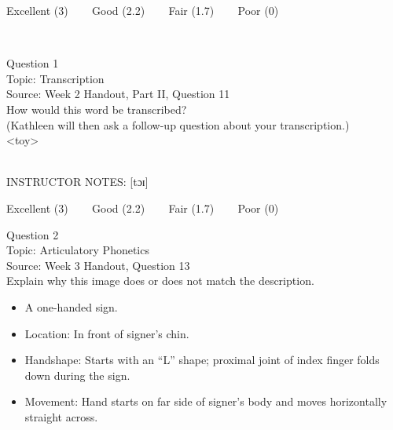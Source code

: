 \documentclass[12pt]{article}
\begin{document}
\vfill
Excellent (3) ~~~ Good (2.2) ~~~ Fair (1.7) ~~~ Poor (0)
\newpage

\begin{center}
\textbf{{\color{red}{\HUGE END OF EXAM}}}\\

\end{center}
\newpage

\begin{center}
\textbf{{\color{blue}{\HUGE START OF EXAM\\}}}

\textbf{{\color{blue}{\HUGE Student ID: 94675\\}}}

\textbf{{\color{blue}{\HUGE \\}}}

\end{center}
\newpage

{\large Question 1}\\

Topic: Transcription\\
Source: Week 2 Handout, Part II, Question 11\\

How would this word be transcribed?\\ (Kathleen will then ask a follow-up question about your transcription.)\\

<toy>


~\\
INSTRUCTOR NOTES: [tɔɪ]


\vfill
Excellent (3) ~~~ Good (2.2) ~~~ Fair (1.7) ~~~ Poor (0)
\newpage

{\large Question 2}\\

Topic: Articulatory Phonetics\\
Source: Week 3 Handout, Question 13\\

Explain why this image does or does not match the description.\\

\begin{itemize} \item A one-handed sign. \item Location: In front of signer’s chin. \item Handshape: Starts with an “L” shape; proximal joint of index finger folds down during the sign. \item Movement: Hand starts on far side of signer’s body and moves horizontally straight across. \end{itemize}
\end{document}
